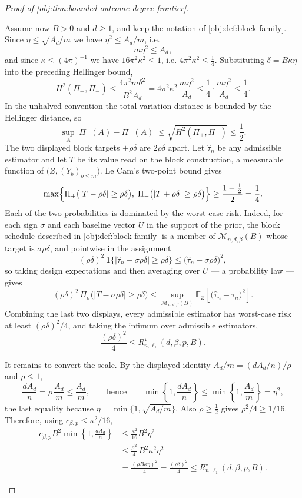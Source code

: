 \begin{proof}[Proof of \cref{obj:thm:bounded-outcome-degree-frontier}]
\begin{enumerate}
Assume now \(B>0\) and \(d\ge1\), and keep the notation of
\cref{obj:def:block-family}.  Since
\(\eta\le\sqrt{A_d/m}\) we have \(\eta^2\le A_d/m\), i.e.
\[
m\eta^2\le A_d ,
\]
and since \(\kappa\le(4\pi)^{-1}\) we have \(16\pi^2\kappa^2\le1\), i.e.
\(4\pi^2\kappa^2\le\tfrac14\).  Substituting \(\delta=B\kappa\eta\) into the preceding Hellinger bound,
\[
H^2(\Pi_+,\Pi_-)
\le
\frac{4\pi^2m\delta^2}{B^2A_d}
=
4\pi^2\kappa^2\,\frac{m\eta^2}{A_d}
\le
\frac14\cdot\frac{m\eta^2}{A_d}
\le
\frac14 .
\]
In the unhalved convention the total variation distance is bounded by the
Hellinger distance, so
\[
\sup_{A}\bigl|\Pi_+(A)-\Pi_-(A)\bigr|
\le
\sqrt{H^2(\Pi_+,\Pi_-)}
\le
\frac12 .
\]
The two displayed block targets \(\pm\rho\delta\) are \(2\rho\delta\) apart.  Let
\(\widehat\tau_n\) be any admissible estimator and let \(T\) be its value read on
the block construction, a measurable function of \(\bigl(Z,(Y_b)_{b\le m}\bigr)\).
Le Cam's two-point bound gives
\[
\max\Bigl\{
\Pi_+\bigl(|T-\rho\delta|\ge\rho\delta\bigr),
\;
\Pi_-\bigl(|T+\rho\delta|\ge\rho\delta\bigr)
\Bigr\}
\ge
\frac{1-\tfrac12}{2}
=
\frac14 .
\]
Each of the two probabilities is dominated by the worst-case risk.  Indeed, for
each sign \(\sigma\) and each baseline vector \(U\) in the support of the prior,
the block schedule described in \cref{obj:def:block-family} is a member of
\(\mathcal M_{n,d,\beta}(B)\) whose target is
\(\sigma\rho\delta\), and pointwise in the assignment
\[
(\rho\delta)^2\,\mathbf 1\bigl\{|\widehat\tau_n-\sigma\rho\delta|\ge\rho\delta\bigr\}
\le
\bigl(\widehat\tau_n-\sigma\rho\delta\bigr)^2 ,
\]
so taking design expectations and then averaging over \(U\) — a probability law —
gives
\[
(\rho\delta)^2\,
\Pi_\sigma\bigl(|T-\sigma\rho\delta|\ge\rho\delta\bigr)
\le
\sup_{\mathcal M_{n,d,\beta}(B)}
\mathbb E_Z\!\left[\bigl(\widehat\tau_n-\tau_n\bigr)^2\right].
\]
Combining the last two displays, every admissible estimator has worst-case risk
at least \((\rho\delta)^2/4\), and taking the infimum over admissible estimators,
\[
\frac{(\rho\delta)^2}{4}
\le
R_{n,\ell_1}^{\star}(d,\beta,p,B).
\]

It remains to convert the scale.  By the displayed identity
\(A_d/m=(dA_d/n)/\rho\) and \(\rho\le1\),
\[
\frac{dA_d}{n}=\rho\,\frac{A_d}{m}\le\frac{A_d}{m},
\qquad\text{hence}\qquad
\min\!\left\{1,\frac{dA_d}{n}\right\}
\le
\min\!\left\{1,\frac{A_d}{m}\right\}
=\eta^2 ,
\]
the last equality because \(\eta=\min\{1,\sqrt{A_d/m}\}\).  Also \(\rho\ge\tfrac12\)
gives \(\rho^2/4\ge1/16\).  Therefore, using \(c_{\beta,p}\le\kappa^2/16\),
\[
\begin{aligned}
c_{\beta,p}B^2\min\!\left\{1,\frac{dA_d}{n}\right\}
&\le
\frac{\kappa^2}{16}B^2\eta^2\\
&\le
\frac{\rho^2}{4}\,B^2\kappa^2\eta^2\\
&=
\frac{(\rho B\kappa\eta)^2}{4}
=
\frac{(\rho\delta)^2}{4}
\le
R_{n,\ell_1}^{\star}(d,\beta,p,B).
\end{aligned}
\]


\end{enumerate}
\end{proof}
